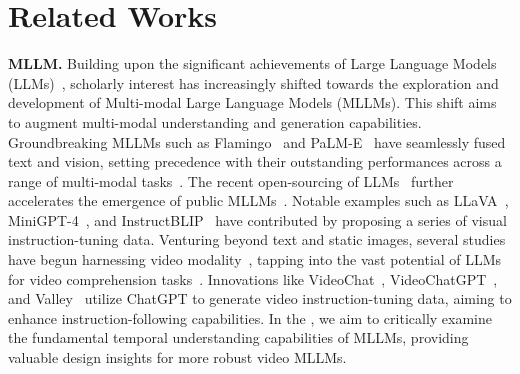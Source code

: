 \section{Related Works}

\noindent\textbf{MLLM.}
Building upon the significant achievements of Large Language Models (LLMs)~\cite{devlin2018bert,t5,gpt3,Wei2021FinetunedLM,palm}, scholarly interest has increasingly shifted towards the exploration and development of Multi-modal Large Language Models (MLLMs). 
This shift aims to augment multi-modal understanding and generation capabilities. 
Groundbreaking MLLMs such as Flamingo~\cite{flamingo} and PaLM-E~\cite{palme} have seamlessly fused text and vision, setting precedence with their outstanding performances across a range of multi-modal tasks~\cite{vqa,fickr,msrvtt,okvqa}.
The recent open-sourcing of LLMs~\cite{llama1,llama2,vicuna,glm,internlm} further accelerates the emergence of public MLLMs~\cite{minigpt4,llava,mmgpt}. 
Notable examples such as LLaVA~\cite{llava}, MiniGPT-4~\cite{minigpt4}, and InstructBLIP~\cite{instructblip} have contributed by proposing a series of visual instruction-tuning data.
Venturing beyond text and static images, several studies have begun harnessing video modality~\cite{videochat,videochatgpt,videollama,valley}, tapping into the vast potential of LLMs for video comprehension tasks~\cite{msrvtt_qa,activitynet_qa,msvd}. 
Innovations like VideoChat~\cite{videochat}, VideoChatGPT~\cite{videochatgpt}, and Valley~\cite{valley} utilize ChatGPT to generate video instruction-tuning data, aiming to enhance instruction-following capabilities.
In the \ModelName, we aim to critically examine the fundamental temporal understanding capabilities of MLLMs, providing valuable design insights for more robust video MLLMs.


